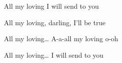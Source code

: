 \begin{song}
\bigskip

All my loving I will send to you \par
All my loving, darling, I'll be true \par

\bigskip

All my loving… A-a-all my loving o-oh \par
All my loving… I will send to you  \par

\end{song}
